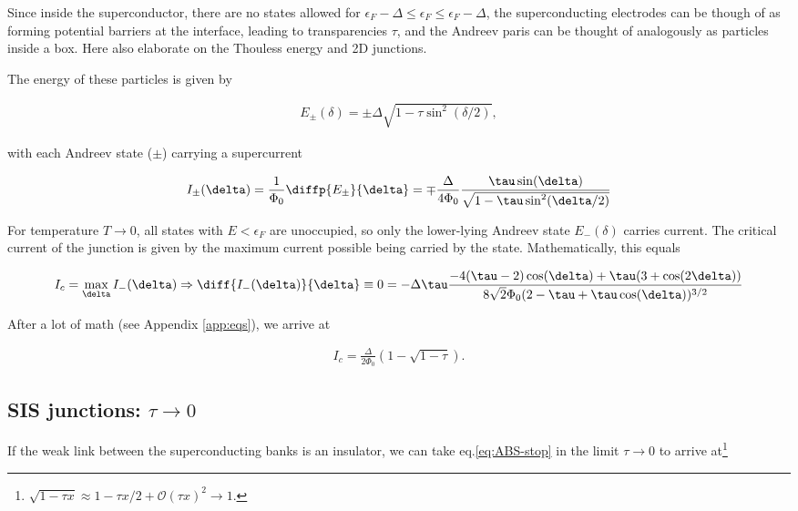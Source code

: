 Since inside the superconductor, there are no states allowed for $\epsilon_F - \Delta \leq \epsilon_F \leq \epsilon_F - \Delta$, the superconducting electrodes can be though of as forming potential barriers at the interface, leading to transparencies $\tau$, and the Andreev paris can be thought of analogously as particles inside a box.
Here also elaborate on the Thouless energy and 2D junctions.

The energy of these particles is given by

\begin{eqnarray}
E_{\pm}(\delta)=\pm\Delta\sqrt{1-\tau\sin^2(\delta/2)},
\end{eqnarray}

with each Andreev state ($\pm$) carrying a supercurrent

\begin{eqnarray}
I_{\pm}(\delta)=\frac{1}{\Phi_0}\diffp{ E_{\pm}}{\delta}=\mp\frac{\Delta}{4\Phi_0}\frac{\tau\sin(\delta)}{\sqrt{1-\tau\sin^2(\delta/2)}}
\label{eq:CPR-full}
\end{eqnarray}

For temperature $T\rightarrow0$, all states with $E<\epsilon_F$ are unoccupied, so only the lower-lying Andreev state $E_{-}(\delta)$ carries current.
The critical current of the junction is given by the maximum current possible being carried by the state. Mathematically, this equals

\begin{eqnarray}
I_c=\max_\delta I_{-}(\delta) \Rightarrow \diff{I_{-}(\delta)}{\delta}\equiv0=-\Delta\tau\frac{-4(\tau-2)\cos(\delta)+\tau(3+\cos(2\delta))}{8\sqrt{2}\Phi_0(2-\tau+\tau\cos(\delta))^{3/2}}
\label{eq:ABS-start}
\end{eqnarray}

After a lot of math (see Appendix \ref{app:eqs}), we arrive at

\begin{eqnarray}
I_c = \frac{\Delta}{2\Phi_0}\left( 1-\sqrt{1-\tau} \right).
\label{eq:ABS-stop}
\end{eqnarray}

\subsection{SIS junctions: $\tau \rightarrow 0$}
If the weak link between the superconducting banks is an insulator, we can take eq.\ref{eq:ABS-stop} in the limit $\tau \rightarrow 0$ to arrive at\footnote{$\sqrt{1-\tau x}\approx 1-\tau x/2+\mathcal{O}(\tau x)^2\rightarrow 1$.}

